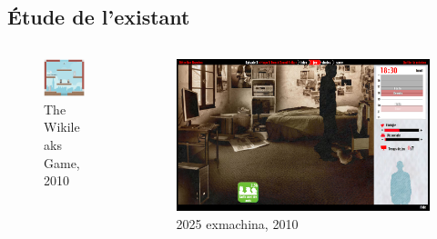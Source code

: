 \documentclass[usepdftitle=false]{beamer}
\begin{document}
	\subsection{Étude de l'existant}
	\begin{frame}		
		\begin{columns}[T]
			\begin{column}{5cm}
				\begin{figure}
    					\includegraphics[scale=0.3]{wikigame.png}
    					\caption{{\tiny The Wikileaks Game, 2010}}
				\end{figure}
			\end{column}

			\begin{column}{5cm}
				\begin{figure}
    					\includegraphics[scale=0.15]{exm.png}
    					\caption{{\tiny 2025 exmachina, 2010}}
				\end{figure}
			\end{column}
		\end{columns}
		

\end{frame}
\end{document}
